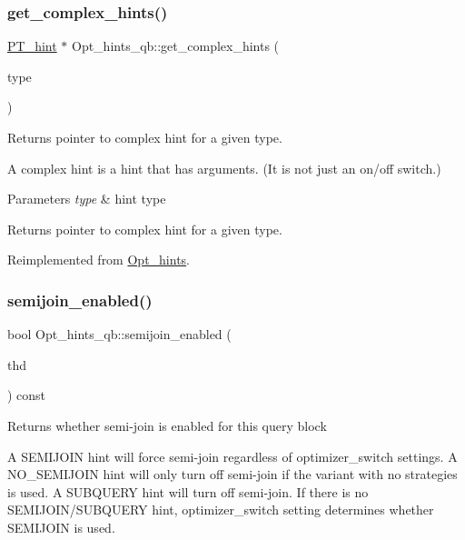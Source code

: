 \subsubsection{\texorpdfstring{get\+\_\+complex\+\_\+hints()}{get\_complex\_hints()}}
{\footnotesize\ttfamily \mbox{\hyperlink{classPT__hint}{P\+T\+\_\+hint}} $\ast$ Opt\+\_\+hints\+\_\+qb\+::get\+\_\+complex\+\_\+hints (\begin{DoxyParamCaption}\item[{opt\+\_\+hints\+\_\+enum}]{type }\end{DoxyParamCaption})\hspace{0.3cm}{\ttfamily [virtual]}}

Returns pointer to complex hint for a given type.

A complex hint is a hint that has arguments. (It is not just an on/off switch.)


\begin{DoxyParams}{Parameters}
{\em type} & hint type\\
\hline
\end{DoxyParams}
\begin{DoxyReturn}{Returns}
pointer to complex hint for a given type. 
\end{DoxyReturn}


Reimplemented from \mbox{\hyperlink{classOpt__hints_a3dd8eb290a7b81d9a6d849de18a61cba}{Opt\+\_\+hints}}.

\mbox{\label{classOpt__hints__qb_a4412c93a6800caf9848c00aca470ffc0}} 
\subsubsection{\texorpdfstring{semijoin\+\_\+enabled()}{semijoin\_enabled()}}
{\footnotesize\ttfamily bool Opt\+\_\+hints\+\_\+qb\+::semijoin\+\_\+enabled (\begin{DoxyParamCaption}\item[{T\+HD $\ast$}]{thd }\end{DoxyParamCaption}) const}

Returns whether semi-\/join is enabled for this query block

A S\+E\+M\+I\+J\+O\+IN hint will force semi-\/join regardless of optimizer\+\_\+switch settings. A N\+O\+\_\+\+S\+E\+M\+I\+J\+O\+IN hint will only turn off semi-\/join if the variant with no strategies is used. A S\+U\+B\+Q\+U\+E\+RY hint will turn off semi-\/join. If there is no S\+E\+M\+I\+J\+O\+I\+N/\+S\+U\+B\+Q\+U\+E\+RY hint, optimizer\+\_\+switch setting determines whether S\+E\+M\+I\+J\+O\+IN is used.


